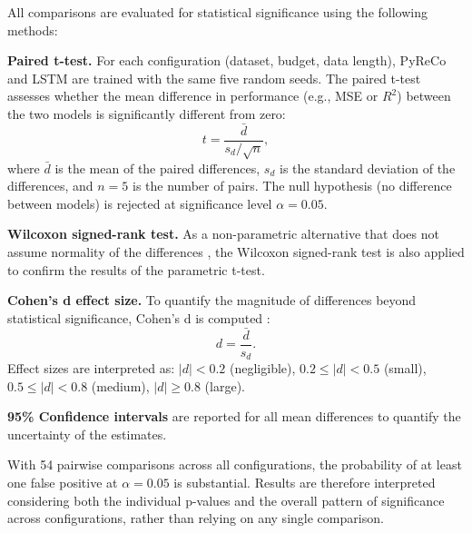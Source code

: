 All comparisons are evaluated for statistical significance using the following methods:

\textbf{Paired t-test.} For each configuration (dataset, budget, data length), PyReCo and LSTM are trained with the same five random seeds. The paired t-test assesses whether the mean difference in performance (e.g., MSE or $R^2$) between the two models is significantly different from zero:
\begin{equation}
    t = \frac{\bar{d}}{s_d / \sqrt{n}},
    \label{eq:ttest}
\end{equation}
where $\bar{d}$ is the mean of the paired differences, $s_d$ is the standard deviation of the differences, and $n = 5$ is the number of pairs. The null hypothesis (no difference between models) is rejected at significance level $\alpha = 0.05$.

\textbf{Wilcoxon signed-rank test.} As a non-parametric alternative that does not assume normality of the differences \cite{wilcoxon1945individual}, the Wilcoxon signed-rank test is also applied to confirm the results of the parametric t-test.

\textbf{Cohen's d effect size.} To quantify the magnitude of differences beyond statistical significance, Cohen's d is computed \cite{cohen1988statistical}:
\begin{equation}
    d = \frac{\bar{d}}{s_d}.
    \label{eq:cohens_d}
\end{equation}
Effect sizes are interpreted as: $|d| < 0.2$ (negligible), $0.2 \leq |d| < 0.5$ (small), $0.5 \leq |d| < 0.8$ (medium), $|d| \geq 0.8$ (large).

\textbf{95\% Confidence intervals} are reported for all mean differences to quantify the uncertainty of the estimates.

With 54 pairwise comparisons across all configurations, the probability of at least one false positive at $\alpha = 0.05$ is substantial. Results are therefore interpreted considering both the individual p-values and the overall pattern of significance across configurations, rather than relying on any single comparison.

